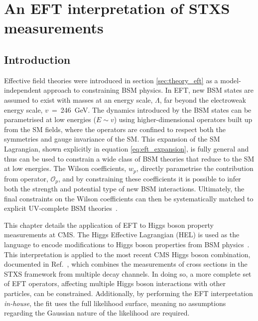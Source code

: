 \chapter{An EFT interpretation of STXS measurements}
\label{chap:eft}

\section{Introduction}

Effective field theories were introduced in section \ref{sec:theory_eft} as a model-independent approach to constraining BSM physics. In EFT, new BSM states are assumed to exist with masses at an energy scale, $\Lambda$, far beyond the electroweak energy scale, $v$~=~246~GeV. The dynamics introduced by the BSM states can be parametrised at low energies ($E \sim v$) using higher-dimensional operators built up from the SM fields, where the operators are confined to respect both the symmetries and gauge invariance of the SM. This expansion of the SM Lagrangian, shown explicitly in equation \ref{eq:eft_expansion}, is fully general and thus can be used to constrain a wide class of BSM theories that reduce to the SM at low energies. The Wilson coefficients, $w_p$, directly parametrise the contribution from operator, $\mathcal{O}_p$, and by constraining these coefficients it is possible to infer both the strength and potential type of new BSM interactions. Ultimately, the final constraints on the Wilson coefficients can then be systematically matched to explicit UV-complete BSM theories~\cite{Marzocca:2020jze}.

This chapter details the application of EFT to Higgs boson property measurements at CMS. The Higgs Effective Lagrangian (HEL) is used as the language to encode modifications to Higgs boson properties from BSM physics~\cite{Contino:2013kra,Alloul:2013naa}. This interpretation is applied to the most recent CMS Higgs boson combination, documented in Ref.~\cite{CMS-PAS-HIG-19-005}, which combines the measurements of cross sections in the STXS framework from multiple decay channels. In doing so, a more complete set of EFT operators, affecting multiple Higgs boson interactions with other particles, can be constrained. Additionally, by performing the EFT interpretation \textit{in-house}, the fit uses the full likelihood surface, meaning no assumptions regarding the Gaussian nature of the likelihood are required.

